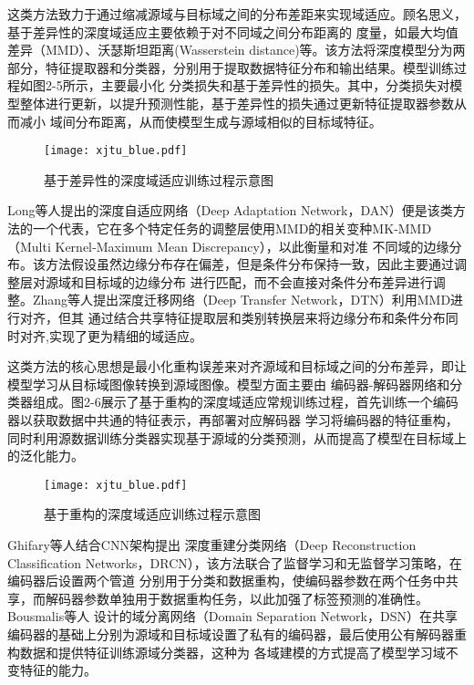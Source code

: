 这类方法致力于通过缩减源域与目标域之间的分布差距来实现域适应。顾名思义，基于差异性的深度域适应主要依赖于对不同域之间分布距离的
度量，如最大均值差异（MMD）、沃瑟斯坦距离(Wasserstein distance)等。该方法将深度模型分为两部分，特征提取器和分类器，分别用于提取数据特征分布和输出结果。模型训练过程如图2-5所示，主要最小化
分类损失和基于差异性的损失。其中，分类损失对模型整体进行更新，以提升预测性能，基于差异性的损失通过更新特征提取器参数从而减小
域间分布距离，从而使模型生成与源域相似的目标域特征。
\begin{figure}[H]
    \centering
    \texttt{[image: xjtu\_blue.pdf]}
    \caption{基于差异性的深度域适应训练过程示意图}
\end{figure}

Long等人\cite{long2015learning}提出的深度自适应网络（Deep Adaptation Network，DAN）便是该类方法的一个代表，它在多个特定任务的调整层使用MMD的相关变种MK‐MMD（Multi Kernel‐Maximum Mean Discrepancy），以此衡量和对准
不同域的边缘分布。该方法假设虽然边缘分布存在偏差，但是条件分布保持一致，因此主要通过调整层对源域和目标域的边缘分布
进行匹配，而不会直接对条件分布差异进行调整。Zhang等人\cite{zhang2015deep}提出深度迁移网络（Deep Transfer Network，DTN）利用MMD进行对齐，但其
通过结合共享特征提取层和类别转换层来将边缘分布和条件分布同时对齐,实现了更为精细的域适应。

这类方法的核心思想是最小化重构误差来对齐源域和目标域之间的分布差异，即让模型学习从目标域图像转换到源域图像。模型方面主要由
编码器-解码器网络和分类器组成。图2-6展示了基于重构的深度域适应常规训练过程，首先训练一个编码器以获取数据中共通的特征表示，再部署对应解码器
学习将编码器的特征重构，同时利用源数据训练分类器实现基于源域的分类预测，从而提高了模型在目标域上的泛化能力。
\begin{figure}[H]
    \centering
    \texttt{[image: xjtu\_blue.pdf]}
    \caption{基于重构的深度域适应训练过程示意图}
\end{figure}
Ghifary等人\cite{ghifary2016deep}结合CNN架构提出
深度重建分类网络（Deep Reconstruction Classification Networks，DRCN），该方法联合了监督学习和无监督学习策略，在编码器后设置两个管道
分别用于分类和数据重构，使编码器参数在两个任务中共享，而解码器参数单独用于数据重构任务，以此加强了标签预测的准确性。Bousmalis等人\cite{bousmalis2016domain}
设计的域分离网络（Domain Separation Network，DSN）在共享编码器的基础上分别为源域和目标域设置了私有的编码器，最后使用公有解码器重构数据和提供特征训练源域分类器，这种为
各域建模的方式提高了模型学习域不变特征的能力。

